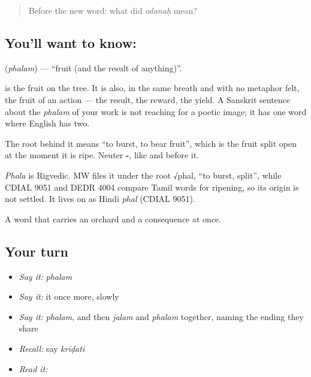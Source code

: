 \label{lesson:SA-C24-fruit}



\begin{quote}
Before the new word: what did \emph{odanaḥ} mean?
\end{quote}

\subsection*{You'll want to know: }
\textbf{} (\emph{phalam}) — \textquotedblleft{}fruit (and the result of anything)\textquotedblright{}.

\textbf{} is the fruit on the tree. It is also, in the same breath and with no metaphor felt, the fruit of an action — the result, the reward, the yield. A Sanskrit sentence about the \emph{phalam} of your work is not reaching for a poetic image; it has one word where English has two.

The root behind it means \textquotedblleft{}to burst, to bear fruit\textquotedblright{}, which is the fruit split open at the moment it is ripe. Neuter \textbf{-}, like  and  before it.

\begin{cousinweb}
\emph{Phala} is Rigvedic. MW files it under the root √phal, \textquotedblleft{}to burst, split\textquotedblright{}, while CDIAL 9051 and DEDR 4004 compare Tamil words for ripening, so its origin is not settled. It lives on as Hindi \emph{phal} (CDIAL 9051).
\end{cousinweb}

\begin{grammarlens}[title={What you've built}]
A word that carries an orchard and a consequence at once.
\end{grammarlens}

\subsection*{Your turn}
\begin{itemize}
\raggedright
  \item \emph{Say it:} \emph{phalam}
  \item \emph{Say it:} it once more, slowly
  \item \emph{Say it:} \emph{phalam}, and then \emph{jalam} and \emph{phalam} together, naming the ending they share
  \item \emph{Recall:} say \emph{krīḍati}
  \item \emph{Read it:} \textbf{}
\end{itemize}

